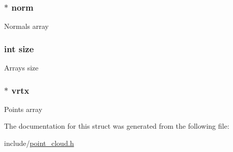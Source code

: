 \subsubsection[{\texorpdfstring{norm}{norm}}]{$\ast$ norm}\hypertarget{struct_point_cloud_aaa4eb83d6f0f6e7ca1065538784d7de8}{}\label{struct_point_cloud_aaa4eb83d6f0f6e7ca1065538784d7de8}
Normals array 
\subsubsection[{\texorpdfstring{size}{size}}]{\setlength{\rightskip}{0pt plus 5cm}int size}\hypertarget{struct_point_cloud_a439227feff9d7f55384e8780cfc2eb82}{}\label{struct_point_cloud_a439227feff9d7f55384e8780cfc2eb82}
Arrays size 
\subsubsection[{\texorpdfstring{vrtx}{vrtx}}]{$\ast$ vrtx}\hypertarget{struct_point_cloud_acc4ce4ac840fff526719963ba4289b8b}{}\label{struct_point_cloud_acc4ce4ac840fff526719963ba4289b8b}
Points array 

The documentation for this struct was generated from the following file\+:\begin{DoxyCompactItemize}
\item 
include/\hyperlink{point__cloud_8h}{point\+\_\+cloud.\+h}\end{DoxyCompactItemize}

